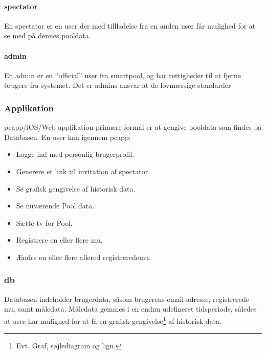 \paragraph{\gls{spectator}}
En \gls{spectator} er en \gls{user} der med tillladelse fra en anden \gls{user} får mulighed for at se med på dennes pooldata. 

\paragraph{\gls{admin}}
En \gls{admin} er en “official” user fra \gls{smartpool}, og har rettigheder til at fjerne brugere fra systemet. Det er \glspl{admin} ansvar at de lovmæssige standarder%
	
\subsubsection{Applikation}
\gls{pcapp}/iOS/Web applikation primære formål er at gengive pooldata som findes på Databasen. En \gls{user} kan igennem \gls{pcapp}:

\begin{itemize}
	\item Logge ind med personlig brugerprofil.
	\item Generere et link til invitation af \gls{spectator}.
	\item Se grafisk gengivelse af historisk data.
	\item Se nuværende Pool data.
	\item Sætte \gls{tv} for Pool.
	\item Registrere en eller flere \gls{mu}.
	\item Ændre en eller flere allered registrerede\gls{mu}.
\end{itemize}

\subsubsection{\gls{db}}
Databasen indeholder brugerdata, såsom brugerens email-adresse, registrerede \gls{mu}, samt måledata. Måledata gemmes i en endnu udefineret tidsperiode, således at \gls{user} har mulighed for at få en grafisk gengivelse\footnote{Evt. Graf, søjlediagram og lign.} af historisk data.

